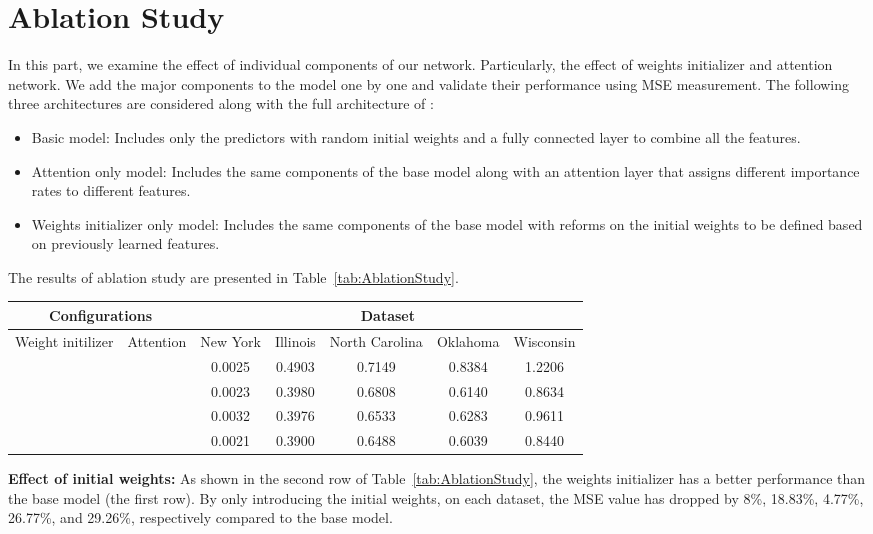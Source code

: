 \documentclass[conference]{IEEEtran}
\newcommand{\cmark}{\ding{51}}%
\newcommand{\xmark}{\ding{55}}%
\begin{document}
\section{Ablation Study}

In this part, we examine the effect of individual components of our network. Particularly, the effect of weights initializer and attention network. We add the major components to the model one by one and validate their performance using MSE measurement. The following three architectures are considered along with the full architecture of \name:
\begin{itemize}
\item Basic model: Includes only the predictors with random initial weights and a fully connected layer to combine all the features.
\item Attention only model: Includes the same components of the base model along with an attention layer that assigns different importance rates to different features.
\item Weights initializer only model: Includes the same components of the base model with reforms on the initial weights to be defined based on previously learned features. 
\end{itemize}

The results of ablation study are presented in Table~\ref{tab:AblationStudy}.
\begin{table*}
\centering
  \caption{MSE result for ablation study results on several datasets}
    \label{tab:AblationStudy}
     \begin{tabular}{|cc||ccccc|}
        \hline
        \multicolumn{2}{|c||}{Configurations} &  \multicolumn{5}{c|}{Dataset}  \\ \hline
 Weight initilizer & Attention & New York& Illinois & North Carolina & Oklahoma &  Wisconsin \\ \hline
        \hline
        \xmark & \xmark & 0.0025 &0.4903& 0.7149 & 0.8384 & 1.2206 \\
        \cmark & \xmark & 0.0023 & 0.3980 &0.6808& 0.6140 & 0.8634 \\
        \xmark &  \cmark & 0.0032 & 0.3976 &0.6533& 0.6283 & 0.9611 \\
         \cmark &  \cmark & 0.0021 & 0.3900 & 0.6488  & 0.6039 &0.8440 \\
    \hline
  \end{tabular}
\end{table*}
\noindent\textbf{Effect of initial weights:} As shown in the second row of Table~\ref{tab:AblationStudy}, the weights initializer has a better performance than the base model (the first row). By only introducing the initial weights, on each dataset, the MSE value has dropped by 8\%, 18.83\%, 4.77\%, 26.77\%, and 29.26\%, respectively compared to the base model.
 
\end{document}
